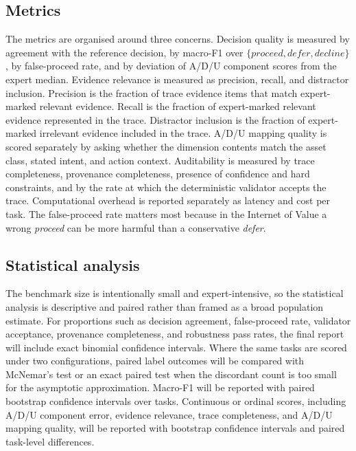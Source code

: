 \subsection{Metrics}

The metrics are organised around three concerns. Decision quality is measured by agreement with the reference decision, by macro-F1 over $\{\textit{proceed}, \textit{defer}, \textit{decline}\}$, by false-proceed rate, and by deviation of A/D/U component scores from the expert median. Evidence relevance is measured as precision, recall, and distractor inclusion. Precision is the fraction of trace evidence items that match expert-marked relevant evidence. Recall is the fraction of expert-marked relevant evidence represented in the trace. Distractor inclusion is the fraction of expert-marked irrelevant evidence included in the trace. A/D/U mapping quality is scored separately by asking whether the dimension contents match the asset class, stated intent, and action context. Auditability is measured by trace completeness, provenance completeness, presence of confidence and hard constraints, and by the rate at which the deterministic validator accepts the trace. Computational overhead is reported separately as latency and cost per task. The false-proceed rate matters most because in the Internet of Value a wrong \textit{proceed} can be more harmful than a conservative \textit{defer}.

\subsection{Statistical analysis}

The benchmark size is intentionally small and expert-intensive, so the statistical analysis is descriptive and paired rather than framed as a broad population estimate. For proportions such as decision agreement, false-proceed rate, validator acceptance, provenance completeness, and robustness pass rates, the final report will include exact binomial confidence intervals. Where the same tasks are scored under two configurations, paired label outcomes will be compared with McNemar's test or an exact paired test when the discordant count is too small for the asymptotic approximation. Macro-F1 will be reported with paired bootstrap confidence intervals over tasks. Continuous or ordinal scores, including A/D/U component error, evidence relevance, trace completeness, and A/D/U mapping quality, will be reported with bootstrap confidence intervals and paired task-level differences.

